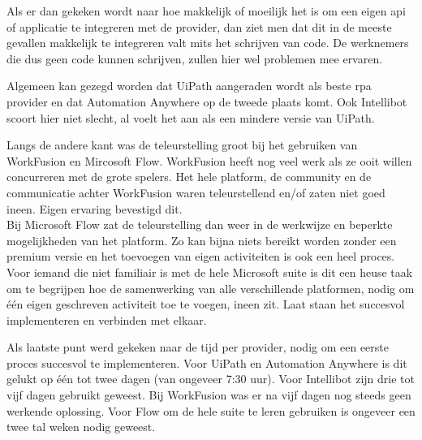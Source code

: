 Als er dan gekeken wordt naar hoe makkelijk of moeilijk het is om een eigen \acrshort{api} of applicatie te integreren met de provider, dan ziet men dat dit in de meeste gevallen makkelijk te integreren valt mits het schrijven van code. De werknemers die dus geen code kunnen schrijven, zullen hier wel problemen mee ervaren.

Algemeen kan gezegd worden dat UiPath aangeraden wordt als beste \acrshort{rpa} provider en dat Automation Anywhere op de tweede plaats komt. Ook Intellibot scoort hier niet slecht, al voelt het aan als een mindere versie van UiPath.

Langs de andere kant was de teleurstelling groot bij het gebruiken van WorkFusion en Mircosoft Flow. WorkFusion heeft nog veel werk als ze ooit willen concurreren met de grote spelers. Het hele platform, de community en de communicatie achter WorkFusion waren teleurstellend en/of zaten niet goed ineen. Eigen ervaring bevestigd dit.\\
Bij Microsoft Flow zat de teleurstelling dan weer in de werkwijze en beperkte mogelijkheden van het platform. Zo kan bijna niets bereikt worden zonder een premium versie en het toevoegen van eigen activiteiten is ook een heel proces. Voor iemand die niet familiair is met de hele Microsoft suite is dit een heuse taak om te begrijpen hoe de samenwerking van alle verschillende platformen, nodig om één eigen geschreven \gls{activiteit} toe te voegen, ineen zit. Laat staan het succesvol implementeren en verbinden met elkaar.

Als laatste punt werd gekeken naar de tijd per provider, nodig om een eerste proces succesvol te implementeren. Voor UiPath en Automation Anywhere is dit gelukt op één tot twee dagen (van ongeveer 7:30 uur). Voor Intellibot zijn drie tot vijf dagen gebruikt geweest. Bij WorkFusion was er na vijf dagen nog steeds geen werkende oplossing. Voor Flow om de hele suite te leren gebruiken is ongeveer een twee tal weken nodig geweest.